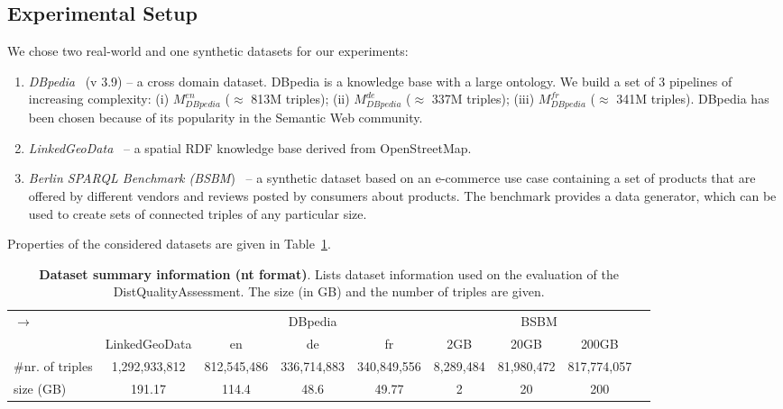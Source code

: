 \subsection{Experimental Setup}

We chose two real-world and one synthetic datasets for our experiments:
 \begin{enumerate}
 \item \emph{DBpedia}~\cite{dbpedia-swj} (v 3.9) -- a cross domain dataset.
 DBpedia is a knowledge base with a large ontology.
 We build a set of 3 pipelines of increasing complexity: (i) $M_{DBpedia}^{en}$ ($\approx$ 813M triples); (ii) $M_{DBpedia}^{de}$ ($\approx$ 337M triples); (iii) $M_{DBpedia}^{fr}$ ($\approx$ 341M triples). 
DBpedia has been chosen because of its popularity in the Semantic Web community.
\item \emph{LinkedGeoData}~\cite{SLHA11} -- a spatial \gls{RDF} knowledge base derived from OpenStreetMap.
\item \emph{Berlin \gls{SPARQL} Benchmark (BSBM})~\cite{Bizer2009TheBS}  -- a synthetic dataset based on an e-commerce use case containing a set of products that are offered by different vendors and reviews posted by consumers about products.
The benchmark provides a data generator, which can be used to create sets of connected triples of any particular size.
 \end{enumerate}
Properties of the considered datasets are given in Table~\ref{tab:qa-dataset_info}.

\begin{table}
\centering
\begin{tabularx}{\textwidth}{Xcccccccc}	
\toprule
\multirow{2}{*}{$\longrightarrow$} & \multicolumn{1}{c}{} & \multicolumn{3}{c|}{DBpedia} & \multicolumn{4}{c}{BSBM} \\
\cline{3-9}  \rule{0pt}{10pt}
& LinkedGeoData & \scriptsize{en} & \scriptsize{de} & \scriptsize{fr}  & \scriptsize{2GB} &\scriptsize{20GB} &\scriptsize{200GB} &\\
\midrule
\scriptsize{\#nr. of triples}& \scriptsize{1,292,933,812} & \scriptsize{812,545,486} & \scriptsize{336,714,883} & \scriptsize{340,849,556} & \scriptsize{8,289,484} & \scriptsize{81,980,472} & \scriptsize{817,774,057} &  \\
\scriptsize{size (GB)} & \scriptsize{191.17} & \scriptsize{114.4} & \scriptsize{48.6} & \scriptsize{49.77} & \scriptsize{2} &\scriptsize{20} &\scriptsize{200} &\\
\bottomrule
\end{tabularx}
{\caption{\textbf{Dataset summary information (nt format)}.
Lists dataset information used on the evaluation of the DistQualityAssessment.
The size (in GB) and the number of triples are given.}
\label{tab:qa-dataset_info}}
\end{table}

